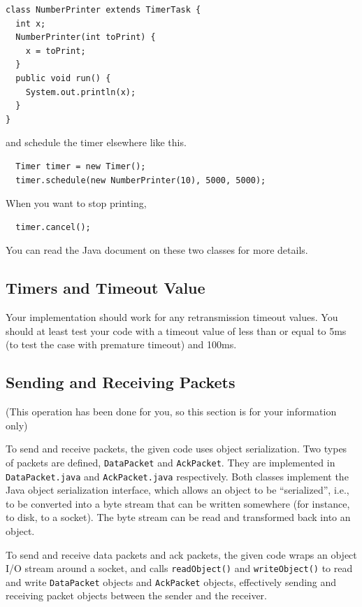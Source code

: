 \documentclass[a4paper,11pt]{exam}
\begin{document}
\begin{verbatim}
class NumberPrinter extends TimerTask {
  int x;
  NumberPrinter(int toPrint) {
    x = toPrint;
  } 
  public void run() {
    System.out.println(x);
  }
}
\end{verbatim}
and schedule the timer elsewhere like this.
\begin{verbatim}
  Timer timer = new Timer();
  timer.schedule(new NumberPrinter(10), 5000, 5000);
\end{verbatim}
When you want to stop printing,
\begin{verbatim}
  timer.cancel();
\end{verbatim}

You can read the Java document on these two classes for more details.

\subsection*{Timers and Timeout Value}

Your implementation should work for any retransmission timeout values.  You should at least test your code with a timeout value of less than or equal to 5ms (to test the case with premature timeout) and 100ms.

\subsection*{Sending and Receiving Packets}

(This operation has been done for you, so this section is for your information only)

To send and receive packets, the given code uses object serialization.  Two types of packets are defined, \texttt{DataPacket} and \texttt{AckPacket}.  They are implemented in \texttt{DataPacket.java} and \texttt{AckPacket.java} respectively.  Both classes implement the Java object serialization interface, which allows an object to be ``serialized'', i.e., to be converted into a byte stream that can be written somewhere (for instance, to disk, to a socket).  The byte stream can be read and transformed back into an object.

To send and receive data packets and ack packets, the given code wraps an object I/O stream around a socket, and calls \texttt{readObject()} and \texttt{writeObject()} to read and write \texttt{DataPacket} objects and \texttt{AckPacket} objects, effectively sending and receiving packet objects between the sender and the receiver.
\end{document}
